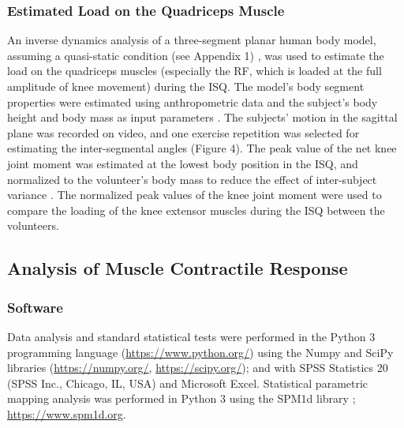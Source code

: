 \documentclass[utf8]{FrontiersinHarvard}
\begin{document}
\subsubsection{Estimated Load on the Quadriceps Muscle}
An inverse dynamics analysis of a three-segment planar human body model, assuming a quasi-static condition (see Appendix 1) \citep{yoshioka, fry, hof}, was used to estimate the load on the quadriceps muscles (especially the RF, which is loaded at the full amplitude of knee movement) during the ISQ.
The model's body segment properties were estimated using anthropometric data and the subject’s body height and body mass as input parameters \citep{winter}.
The subjects' motion in the sagittal plane was recorded on video, and one exercise repetition was selected for estimating the inter-segmental angles (Figure 4).
The peak value of the net knee joint moment was estimated at the lowest body position in the ISQ,
and normalized to the volunteer’s body mass to reduce the effect of inter-subject variance \citep{wannop, moiso}.
The normalized peak values of the knee joint moment were used to compare the loading of the knee extensor muscles during the ISQ between the volunteers.

\subsection{Analysis of Muscle Contractile Response} \label{ss:analysis}

\subsubsection{Software}
Data analysis and standard statistical tests were performed in the Python 3 programming language (\url{https://www.python.org/}) using the Numpy and SciPy libraries (\url{https://numpy.org/}, \url{https://scipy.org/});
and with SPSS Statistics 20 (SPSS Inc., Chicago, IL, USA) and Microsoft Excel.
Statistical parametric mapping analysis was performed in Python 3 using the SPM1d library \citep{pataky-spm1d}; \url{https://www.spm1d.org}.
\end{document}
